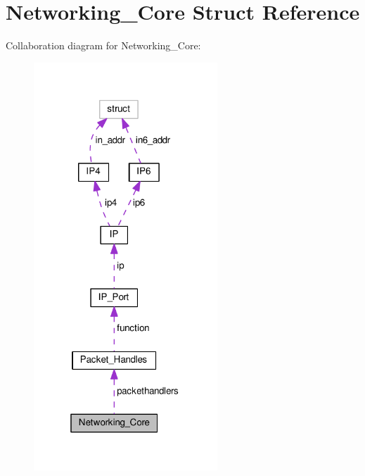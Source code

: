 \hypertarget{struct_networking___core}{\section{Networking\+\_\+\+Core Struct Reference}
\label{struct_networking___core}
}


Collaboration diagram for Networking\+\_\+\+Core\+:\nopagebreak
\begin{figure}[H]
\begin{center}
\leavevmode
\includegraphics[width=196pt]{struct_networking___core__coll__graph}
\end{center}
\end{figure}
